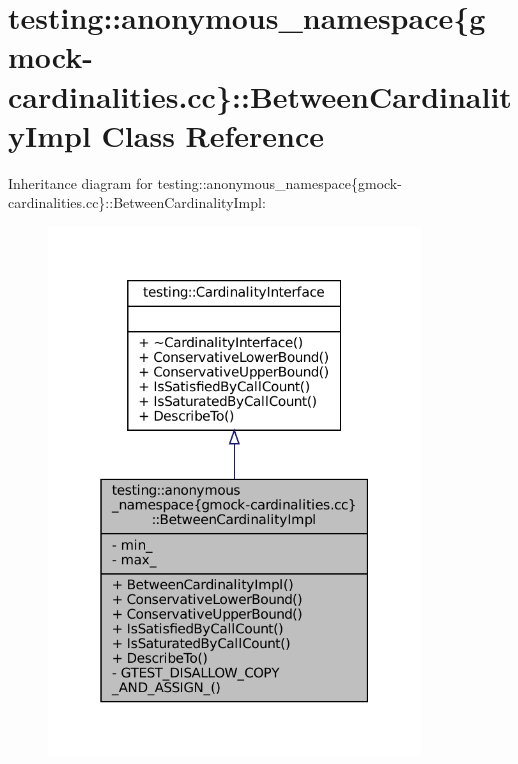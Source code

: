 \hypertarget{classtesting_1_1anonymous__namespace_02gmock-cardinalities_8cc_03_1_1BetweenCardinalityImpl}{}\section{testing\+:\+:anonymous\+\_\+namespace\{gmock-\/cardinalities.cc\}\+:\+:Between\+Cardinality\+Impl Class Reference}
\label{classtesting_1_1anonymous__namespace_02gmock-cardinalities_8cc_03_1_1BetweenCardinalityImpl}


Inheritance diagram for testing\+:\+:anonymous\+\_\+namespace\{gmock-\/cardinalities.cc\}\+:\+:Between\+Cardinality\+Impl\+:
\nopagebreak
\begin{figure}[H]
\begin{center}
\leavevmode
\includegraphics[width=280pt]{classtesting_1_1anonymous__namespace_02gmock-cardinalities_8cc_03_1_1BetweenCardinalityImpl__inherit__graph}
\end{center}
\end{figure}


